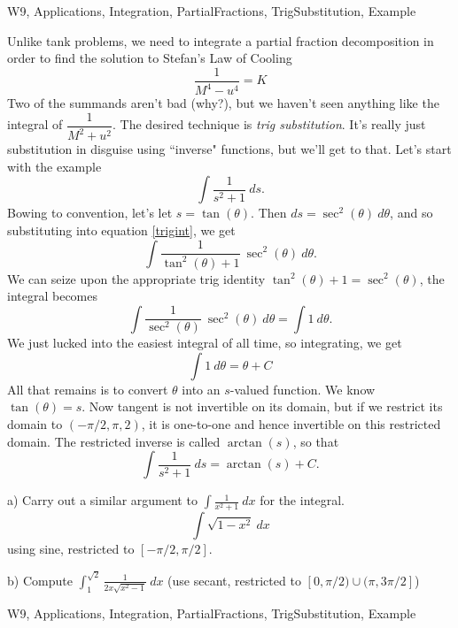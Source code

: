 \begin{tagblock}{W9, Applications, Integration, PartialFractions, TrigSubstitution, Example}
\begin{question}
	


Unlike tank problems, we need to integrate a partial fraction decomposition in order to find the solution to Stefan's Law of Cooling
\begin{equation}\label{Stef}
\frac 1 {M^4-u^4}=K
\end{equation}
Two of the summands aren't bad (why?), but we haven't seen anything like the integral of $\dfrac 1 {M^2+u^2}$. The desired technique is \textit{trig substitution}. It's really just substitution in disguise using ``inverse" functions, but we'll get to that. Let's start with the example
\begin{equation}\label{trigint}
\int \frac 1 {s^2+1} \ ds.
\end{equation}
Bowing to convention, let's let $s=\tan(\theta)$. Then $ds=\sec^2(\theta) \ d\theta$, and so substituting into equation \eqref{trigint}, we get
\[
\int \frac 1 {\tan^2(\theta)+1} \ \sec^2(\theta) \ d\theta.
\]
We can seize upon the appropriate trig identity $\tan^2(\theta)+1=\sec^2(\theta)$, the integral becomes
\[
\int \frac 1 {\sec^2(\theta)} \ \sec^2(\theta) \ d\theta=\int 1 \ d\theta.
\]
We just lucked into the easiest integral of all time, so integrating, we get 
\[
\int 1 \ d\theta=\theta +C
\]
All that remains is to convert $\theta$ into an $s$-valued function. We know $\tan(\theta)=s$. Now tangent is not invertible on its domain, but if we restrict its domain to $(-\pi/2,\pi,2)$, it is one-to-one and hence invertible on this restricted domain. The restricted inverse is called $\arctan(s)$, so that
\[
\int \frac 1 {s^2+1} \ ds=\arctan(s)+C.
\]

a) Carry out a similar argument to $\displaystyle\int \frac 1 {x^2+1} \ dx$ for the integral.
\[
\int \sqrt{1-x^2} \ dx
\]
using sine, restricted to $[-\pi/2,\pi/2]$.



\bigskip

b) Compute $\displaystyle\int_1^{\sqrt{2}}\frac 1 {2x\sqrt{x^2-1}} \ dx$ (use secant, restricted to $[0,\pi/2)\cup (\pi,3\pi/2]$)

    
\begin{tags}
       W9, Applications, Integration, PartialFractions, TrigSubstitution, Example
\end{tags}
    
\begin{diary}
\end{diary}
	
\begin{solution}

\end{solution}
	
\end{question}

\end{tagblock}

